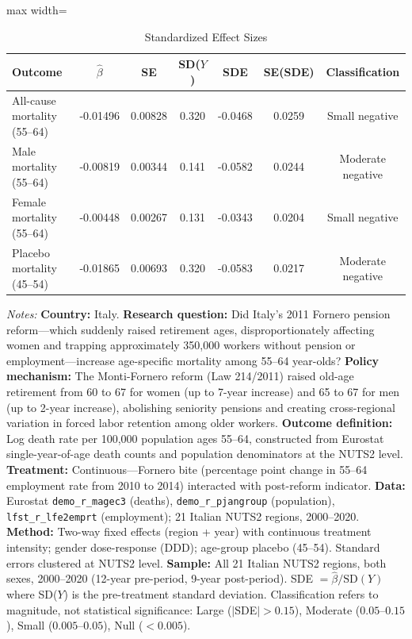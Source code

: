 \begin{table}[htbp]
\centering
\caption{Standardized Effect Sizes}
\label{tab:sde}
\begin{adjustbox}{max width=\textwidth}
\begin{tabular}{lcccccc}
\hline\hline
Outcome & $\hat{\beta}$ & SE & SD($Y$) & SDE & SE(SDE) & Classification \\
\hline
All-cause mortality (55--64) & -0.01496 & 0.00828 & 0.320 & -0.0468 & 0.0259 & Small negative \\
Male mortality (55--64) & -0.00819 & 0.00344 & 0.141 & -0.0582 & 0.0244 & Moderate negative \\
Female mortality (55--64) & -0.00448 & 0.00267 & 0.131 & -0.0343 & 0.0204 & Small negative \\
Placebo mortality (45--54) & -0.01865 & 0.00693 & 0.320 & -0.0583 & 0.0217 & Moderate negative \\
\hline\hline
\end{tabular}
\end{adjustbox}
\begin{tablenotes}[flushleft]\small
\item \textit{Notes:} \textbf{Country:} Italy. \textbf{Research question:} Did Italy's 2011 Fornero pension reform---which suddenly raised retirement ages, disproportionately affecting women and trapping approximately 350,000 workers without pension or employment---increase age-specific mortality among 55--64 year-olds? \textbf{Policy mechanism:} The Monti-Fornero reform (Law 214/2011) raised old-age retirement from 60 to 67 for women (up to 7-year increase) and 65 to 67 for men (up to 2-year increase), abolishing seniority pensions and creating cross-regional variation in forced labor retention among older workers. \textbf{Outcome definition:} Log death rate per 100,000 population ages 55--64, constructed from Eurostat single-year-of-age death counts and population denominators at the NUTS2 level. \textbf{Treatment:} Continuous---Fornero bite (percentage point change in 55--64 employment rate from 2010 to 2014) interacted with post-reform indicator. \textbf{Data:} Eurostat \texttt{demo\_r\_magec3} (deaths), \texttt{demo\_r\_pjangroup} (population), \texttt{lfst\_r\_lfe2emprt} (employment); 21 Italian NUTS2 regions, 2000--2020. \textbf{Method:} Two-way fixed effects (region + year) with continuous treatment intensity; gender dose-response (DDD); age-group placebo (45--54). Standard errors clustered at NUTS2 level. \textbf{Sample:} All 21 Italian NUTS2 regions, both sexes, 2000--2020 (12-year pre-period, 9-year post-period). SDE $= \hat{\beta} / \text{SD}(Y)$ where SD($Y$) is the pre-treatment standard deviation. Classification refers to magnitude, not statistical significance: Large ($|$SDE$| > 0.15$), Moderate ($0.05$--$0.15$), Small ($0.005$--$0.05$), Null ($< 0.005$).
\end{tablenotes}
\end{table}
